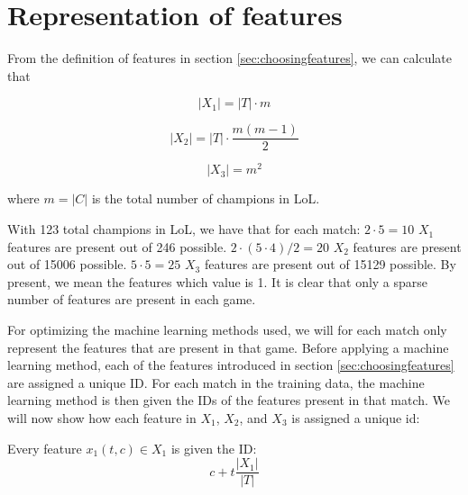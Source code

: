 
\section{Representation of features}
\label{sec:representationoffeatures}
From the definition of features in section \ref{sec:choosingfeatures}, we can calculate that

\[|X_1| = |T| \cdot m \]

\[|X_2| = |T| \cdot \frac{m(m-1)}{2} \]

\[|X_3| = m^2  \]

where $m = |C|$ is the total number of champions in LoL.

With 123 total champions in LoL, we have that for each match:
$2 \cdot 5 = 10$ $X_1$ features are present out of 246 possible.
$2 \cdot (5 \cdot 4)/2 = 20$ $X_2$ features are present out of 15006 possible.
$5 \cdot 5 = 25$ $X_3$ features are present out of 15129 possible.
By present, we mean the features which value is 1.
It is clear that only a sparse number of features are present in each game. 

For optimizing the machine learning methods used, we will for each match only represent the features that are present in that game. 
Before applying a machine learning method, each of the features introduced in section \ref{sec:choosingfeatures} are assigned a unique ID.
For each match in the training data, the machine learning method is then given the IDs of the features present in that match.
We will now show how each feature in $X_1$, $X_2$, and $X_3$ is assigned a unique id:

\begin{center}
Every feature $x_1(t, c) \in X_1$ is given the ID:
\[ c + t \frac{|X_1|}{|T|} \]
\end{center}

